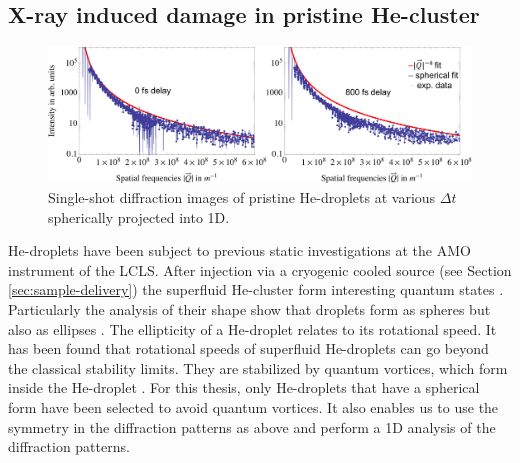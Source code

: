 \subsection{X-ray induced damage in pristine He-cluster}\label{sec:He-data-real}
%
\begin{figure}
	\centering
		\includegraphics[width=1.00\textwidth]{images/results/He-diffraction-patterns2.png}
	\caption[Single-shot diffraction images of He-droplets at different time delays]{Single-shot diffraction images of pristine He-droplets at various $\Delta t$ spherically projected into 1D.}
	\label{fig:He-diffraction-patterns}
\end{figure}
%
He-droplets have been subject to previous static investigations at the AMO instrument of the LCLS. After injection via a cryogenic cooled source (see Section \ref{sec:sample-delivery}) the superfluid He-cluster \cite{Gomez-2011-JCP} form interesting quantum states \cite{Toennies-2004-ACIE,Gomez-2012-PRL}. Particularly the analysis of their shape show that droplets form as spheres but also as ellipses \cite{Bernado-2017-PRB}. The ellipticity of a He-droplet relates to its rotational speed. It has been found that rotational speeds of superfluid He-droplets can go beyond the classical stability limits. They are stabilized by quantum vortices, which form inside the He-droplet \cite{Gomez-2014-Science}. For this thesis, only He-droplets that have a spherical form have been selected to avoid quantum vortices. It also enables us to use the symmetry in the diffraction patterns as above and perform a 1D analysis of the diffraction patterns.
%
